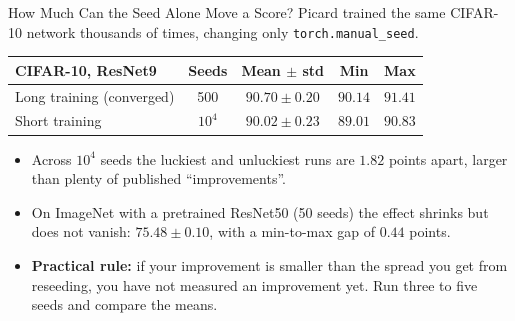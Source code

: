 \begin{frame}{How Much Can the Seed Alone Move a Score?}
Picard trained the same CIFAR-10 network thousands of times, changing only \texttt{torch.manual\_seed}.
\vspace{0.5em}

\begin{center}
\small
\begin{tabular}{|l|c|c|c|c|}
    \hline
    \textbf{CIFAR-10, ResNet9} & \textbf{Seeds} & \textbf{Mean $\pm$ std} & \textbf{Min} & \textbf{Max} \\
    \hline
    Long training (converged) & 500 & $90.70 \pm 0.20$ & $90.14$ & $91.41$ \\
    Short training & $10^4$ & $90.02 \pm 0.23$ & $89.01$ & $90.83$ \\
    \hline
\end{tabular}
\end{center}

\vspace{0.3em}
\begin{itemize}
    \item Across $10^4$ seeds the luckiest and unluckiest runs are $1.82$ points apart, larger than plenty of published ``improvements''.
    \item On ImageNet with a pretrained ResNet50 (50 seeds) the effect shrinks but does not vanish: $75.48 \pm 0.10$, with a min-to-max gap of $0.44$ points.
    \item \textbf{Practical rule:} if your improvement is smaller than the spread you get from reseeding, you have not measured an improvement yet. Run three to five seeds and compare the means.
\end{itemize}
\end{frame}

